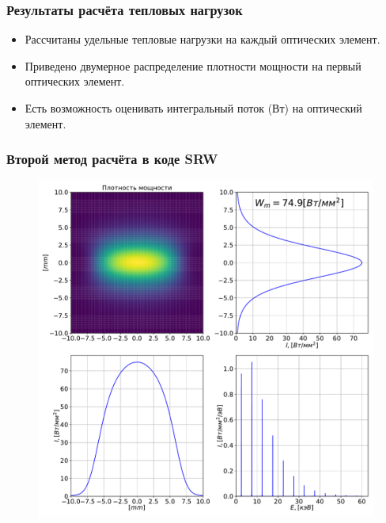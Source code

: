 \documentclass[14pt, hyperref = {colorlinks},xcolor=table ]{beamer}
\begin{document}
\small
\begin{frame}
\frametitle{Результаты расчёта тепловых нагрузок}\label{t1}
	\begin{center}
	\begin{itemize}
		\item Рассчитаны удельные тепловые нагрузки на каждый оптических элемент.\\
		\item Приведено двумерное распределение плотности мощности на первый оптических элемент.\\
		\item Есть возможность оценивать интегральный поток (Вт) на оптический элемент.
	\end{itemize}
	\end{center}	
\end{frame}

\iffalse
\small
\begin{frame}
\frametitle{Второй метод расчёта в коде SRW}\label{t1}
\vspace{-10pt}
\begin{figure}[h]
	\begin{minipage}[h]{0.65\linewidth}
		\vspace{-0pt}
		\includegraphics[width=1.0\linewidth]{pic/power_dens_1-2.pdf}
	\end{minipage}	
\end{figure}
\end{frame}
\end{document}
